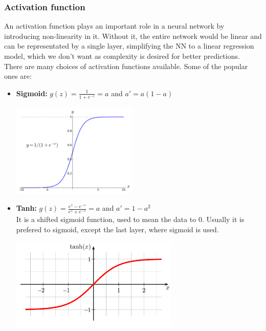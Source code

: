 \documentclass[12pt]{article}
\begin{document}
\subsubsection*{Activation function}
An activation function plays an important role in a neural network by introducing non-linearity in it. Without it, the entire network would be linear and can be representated by a single layer, simplifying the NN to a linear regression model, which we don't want as complexity is desired for better predictions.\\
There are many choices of activation functions available. Some of the popular ones are:
\begin{itemize}
    \item \textbf{Sigmoid: }$g(z) = \frac{1}{1+e^{-z}}=a$ and $a' = a(1-a)$\\
        \begin{center}
            \includegraphics[width=6cm]{sigmoid.png}
        \end{center}
    \item \textbf{Tanh: }$g(z) = \frac{e^z - e^{-z}}{e^z + e^{-z}}=a$ and $a' = 1-a^2$\\It is a shifted sigmoid function, used to mean the data to 0. Usually it is prefered to sigmoid, except the last layer, where sigmoid is used.
        \begin{center}
            \includegraphics[width=8cm]{tanh.png}
        \end{center}
        

\end{itemize}
\end{document}
